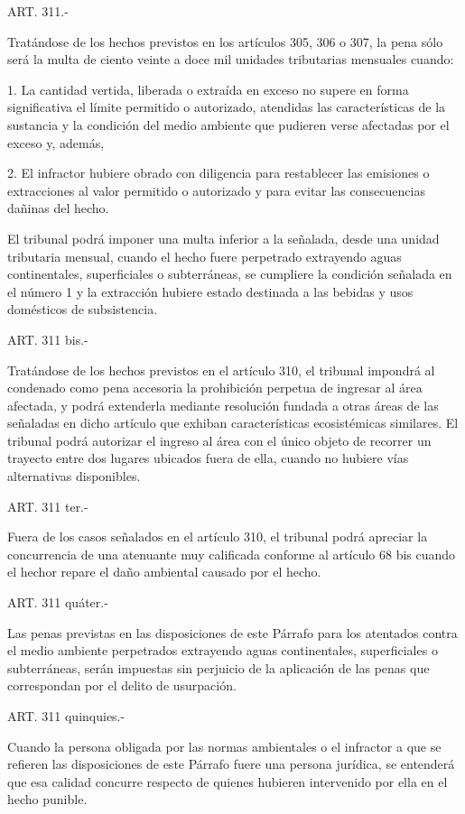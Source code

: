     ART. 311.-

    Tratándose de los hechos previstos en los artículos 305, 306 o 307, la pena sólo será la multa de ciento veinte a doce mil unidades tributarias mensuales cuando:

    1. La cantidad vertida, liberada o extraída en exceso no supere en forma significativa el límite permitido o autorizado, atendidas las características de la sustancia y la condición del medio ambiente que pudieren verse afectadas por el exceso y, además,

    2. El infractor hubiere obrado con diligencia para restablecer las emisiones o extracciones al valor permitido o autorizado y para evitar las consecuencias dañinas del hecho.

    El tribunal podrá imponer una multa inferior a la señalada, desde una unidad tributaria mensual, cuando el hecho fuere perpetrado extrayendo aguas continentales, superficiales o subterráneas, se cumpliere la condición señalada en el número 1 y la extracción hubiere estado destinada a las bebidas y usos domésticos de subsistencia.


    ART. 311 bis.-

    Tratándose de los hechos previstos en el artículo 310, el tribunal impondrá al condenado como pena accesoria la prohibición perpetua de ingresar al área afectada, y podrá extenderla mediante resolución fundada a otras áreas de las señaladas en dicho artículo que exhiban características ecosistémicas similares.
    El tribunal podrá autorizar el ingreso al área con el único objeto de recorrer un trayecto entre dos lugares ubicados fuera de ella, cuando no hubiere vías alternativas disponibles.

   
    ART. 311 ter.-

    Fuera de los casos señalados en el artículo 310, el tribunal podrá apreciar la concurrencia de una atenuante muy calificada conforme al artículo 68 bis cuando el hechor repare el daño ambiental causado por el hecho.


    ART. 311 quáter.-

    Las penas previstas en las disposiciones de este Párrafo para los atentados contra el medio ambiente perpetrados extrayendo aguas continentales, superficiales o subterráneas, serán impuestas sin perjuicio de la aplicación de las penas que correspondan por el delito de usurpación.


    ART. 311 quinquies.-

    Cuando la persona obligada por las normas ambientales o el infractor a que se refieren las disposiciones de este Párrafo fuere una persona jurídica, se entenderá que esa calidad concurre respecto de quienes hubieren intervenido por ella en el hecho punible.


